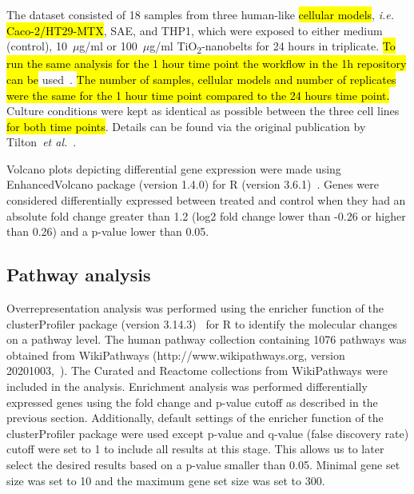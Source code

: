 \documentclass[ijms,article,submit,moreauthors,pdftex]{Definitions/mdpi}
\begin{document}
The dataset consisted of 18 samples from three human-like \hl{cellular models}, \textit{i.e.} \hl{Caco-2/HT29-MTX}, SAE, and THP1, which were exposed to either medium (control), 10~$\mu$g/ml or 100~$\mu$g/ml TiO\textsubscript{2}-nanobelts for 24 hours in triplicate. \hl{To run the same analysis for the 1 hour time point the workflow in the 1h repository can be} used~\cite{TiO2-scripts-1h}. \hl{The number of samples, cellular models and number of replicates were the same for the 1 hour time point compared to the 24 hours time point.} Culture conditions were kept as identical as possible between the three cell lines \hl{for both time points}. Details can be found via the original publication by Tilton~\textit{et al.}~\cite{Tilton2013}.

Volcano plots depicting differential gene expression were made using EnhancedVolcano package (version 1.4.0) for R (version 3.6.1)~\cite{R2020,VolcanoPlot}. Genes were considered differentially expressed between treated and control when they had an absolute fold change greater than 1.2 (log2 fold change lower than -0.26 or higher than 0.26) and a p-value lower than 0.05. 

\subsection*{Pathway analysis}
Overrepresentation analysis was performed using the enricher function of the clusterProfiler package (version 3.14.3)~\cite{Yu2012} for R to identify the molecular changes on a pathway level. The human pathway collection containing 1076 pathways was obtained from WikiPathways (http://www.wikipathways.org, version 20201003,~\cite{Martens2020}). The Curated and Reactome collections from WikiPathways were included in the analysis. Enrichment analysis was performed differentially expressed genes using the fold change and p-value cutoff as described in the previous section. Additionally, default settings of the enricher function of the clusterProfiler package were used except p-value and q-value (false discovery rate) cutoff were set to 1 to include all results at this stage. This allows us to later select the desired results based on a p-value smaller than 0.05. Minimal gene set size was set to 10 and the maximum gene set size was set to 300.
\end{document}
